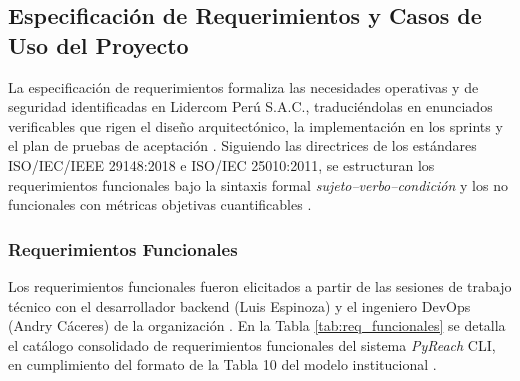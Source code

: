 \subsection{Especificación de Requerimientos y Casos de Uso del Proyecto}
La especificación de requerimientos formaliza las necesidades operativas y de seguridad identificadas en Lidercom Perú S.A.C., traduciéndolas en enunciados verificables que rigen el diseño arquitectónico, la implementación en los sprints y el plan de pruebas de aceptación \parencite{wiegers2013software, torres2026proyecto}. %
Siguiendo las directrices de los estándares ISO/IEC/IEEE 29148:2018 e ISO/IEC 25010:2011, se estructuran los requerimientos funcionales bajo la sintaxis formal \textit{sujeto--verbo--condición} y los no funcionales con métricas objetivas cuantificables \parencite{iso2018req, iso2011sqa, torres2026proyecto}. %

\subsubsection{Requerimientos Funcionales}
Los requerimientos funcionales fueron elicitados a partir de las sesiones de trabajo técnico con el desarrollador backend (Luis Espinoza) y el ingeniero DevOps (Andry Cáceres) de la organización \parencite{kendall2019systems}. %
En la Tabla \ref{tab:req_funcionales} se detalla el catálogo consolidado de requerimientos funcionales del sistema \textit{PyReach} CLI, en cumplimiento del formato de la Tabla 10 del modelo institucional \parencite{torres2026proyecto}. %

